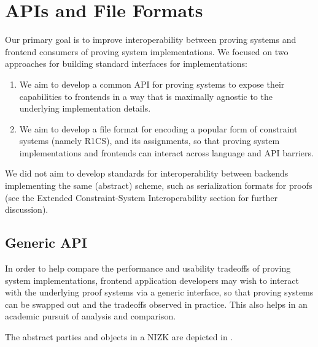 \section{APIs and File Formats}
\label{implem:apis-and-file-formats}

Our primary goal is to improve interoperability between proving systems and frontend consumers of proving system implementations. We focused on two approaches for building standard interfaces for implementations:

\begin{enumerate}
\item We aim to develop a common API for proving systems to expose their capabilities to frontends in a way that is maximally agnostic to the underlying implementation details.
\item We aim to develop a file format for encoding a popular form of constraint systems (namely R1CS), and its assignments, so that proving system implementations and frontends can interact across language and API barriers.
\end{enumerate}

We did not aim to develop standards for interoperability between backends implementing the same (abstract) scheme, such as serialization formats for proofs (see the Extended Constraint-System Interoperability section for further discussion).


\subsection{Generic API}

In order to help compare the performance and usability tradeoffs of proving system implementations, frontend application developers may wish to interact with the underlying proof systems via a generic interface, so that proving systems can be swapped out and the tradeoffs observed in practice. 
This also helps in an academic pursuit of analysis and comparison.

The abstract parties and objects in a NIZK are %
depicted in .



